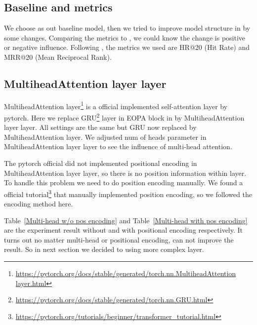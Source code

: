 \documentclass{article}
\begin{document}
\subsection{Baseline and metrics}

We choose \cite{chen2020lessr} as out baseline model,
then we tried to improve model structure in \cite{chen2020lessr} by some changes.
Comparing the metrics to \cite{chen2020lessr},
we could know the change is positive or negative influence.
Following \cite{chen2020lessr},
the metrics we used are HR@20 (Hit Rate) and MRR@20 (Mean Reciprocal Rank).

\subsection{MultiheadAttention layer layer}

MultiheadAttention layer\footnote{\url{https://pytorch.org/docs/stable/generated/torch.nn.MultiheadAttention layer.html}}
is a official implemented self-attention layer by pytorch.
Here we replace GRU\footnote{\url{https://pytorch.org/docs/stable/generated/torch.nn.GRU.html}}
layer in EOPA block in \cite{chen2020lessr} by MultiheadAttention layer layer.
All settings are the same but GRU now replaced by MultiheadAttention layer.
We adjusted num of heads parameter in MultiheadAttention layer layer
to see the influence of multi-head attention.

The pytorch official did not implemented positional encoding in
MultiheadAttention layer layer, so there is no position information within layer.
To handle this problem we need to do position encoding manually.
We found a official tutorial\footnote{\url{https://pytorch.org/tutorials/beginner/transformer_tutorial.html}}
that manually implemented position encoding,
so we followed the encoding method here.

Table~\ref{Multi-head w/o pos encoding} and Table~\ref{Multi-head with pos encoding}
are the experiment result without and with positional encoding respectively.
It turns out no matter multi-head or positional encoding, can not improve the result.
So in next section we decided to using more complex layer.
\end{document}

